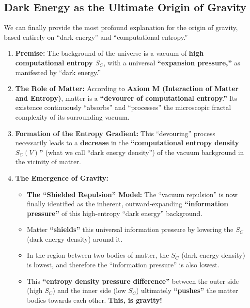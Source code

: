 \documentclass[11pt, a4paper]{article}
\begin{document}
\subsection{Dark Energy as the Ultimate Origin of Gravity}

We can finally provide the most profound explanation for the origin of gravity, based entirely on ``dark energy'' and ``computational entropy.''

\begin{enumerate}
    \item \textbf{Premise:} The background of the universe is a vacuum of \textbf{high computational entropy $S_C$}, with a universal \textbf{``expansion pressure,''} as manifested by ``dark energy.''

    \item \textbf{The Role of Matter:} According to \textbf{Axiom M (Interaction of Matter and Entropy)}, matter is a \textbf{``devourer of computational entropy.''} Its existence continuously ``absorbs'' and ``processes'' the microscopic fractal complexity of its surrounding vacuum.

    \item \textbf{Formation of the Entropy Gradient:} This ``devouring'' process necessarily leads to a \textbf{decrease} in the \textbf{``computational entropy density $S_C(V)$''} (what we call ``dark energy density'') of the vacuum background in the vicinity of matter.

    \item \textbf{The Emergence of Gravity:}
    \begin{itemize}
        \item \textbf{The ``Shielded Repulsion'' Model:} The ``vacuum repulsion'' is now finally identified as the inherent, outward-expanding \textbf{``information pressure''} of this high-entropy ``dark energy'' background.
        \item Matter \textbf{``shields''} this universal information pressure by lowering the $S_C$ (dark energy density) around it.
        \item In the region between two bodies of matter, the $S_C$ (dark energy density) is lowest, and therefore the ``information pressure'' is also lowest.
        \item This \textbf{``entropy density pressure difference''} between the outer side (high $S_C$) and the inner side (low $S_C$) ultimately \textbf{``pushes''} the matter bodies towards each other.
        \textbf{This, is gravity!} \cite{Newton1687}
    \end{itemize}
\end{enumerate}
\end{document}

